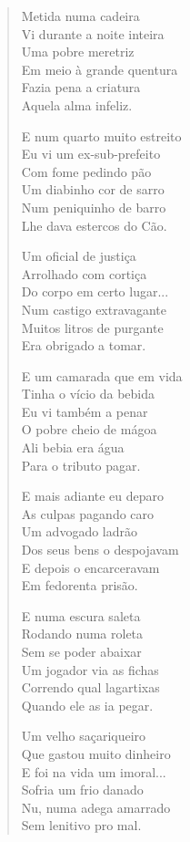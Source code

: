\begin{verse}
Metida numa cadeira\\
Vi durante a noite inteira\\
Uma pobre meretriz\\
Em meio à grande quentura\\
Fazia pena a criatura\\
Aquela alma infeliz.

E num quarto muito estreito\\
Eu vi um ex-sub-prefeito\\
Com fome pedindo pão\\
Um diabinho cor de sarro\\
Num peniquinho de barro\\
Lhe dava estercos do Cão.


Um oficial de justiça\\
Arrolhado com cortiça\\
Do corpo em certo lugar...\\
Num castigo extravagante\\
Muitos litros de purgante\\
Era obrigado a tomar.

E um camarada que em vida\\
Tinha o vício da bebida\\
Eu vi também a penar\\
O pobre cheio de mágoa\\
Ali bebia era água\\
Para o tributo pagar.

E mais adiante eu deparo\\
As culpas pagando caro\\
Um advogado ladrão\\
Dos seus bens o despojavam\\
E depois o encarceravam\\
Em fedorenta prisão.

E numa escura saleta\\
Rodando numa roleta\\
Sem se poder abaixar\\
Um jogador via as fichas\\
Correndo qual lagartixas\\
Quando ele as ia pegar.


Um velho saçariqueiro\\
Que gastou muito dinheiro\\
E foi na vida um imoral...\\
Sofria um frio danado\\
Nu, numa adega amarrado\\
Sem lenitivo pro mal.


\end{verse}
